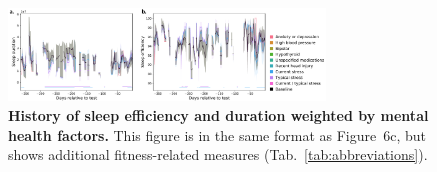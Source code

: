 \documentclass[10pt]{article}
\newcommand{\dynamics}{6}
\begin{document}
\begin{figure}[p]
  \centering
  \includegraphics[width=0.75\textwidth]{figs/weighted_timecourse_sleep_MH}
\caption{\textbf{History of sleep efficiency and duration weighted by
    mental health factors.} This figure is in the same format as
  Figure~\dynamics c, but shows additional fitness-related measures (Tab.~\ref{tab:abbreviations}).}
\label{fig:sleep_timecourse_MH}
  \end{figure}

  \clearpage
  \newpage


\end{document}

